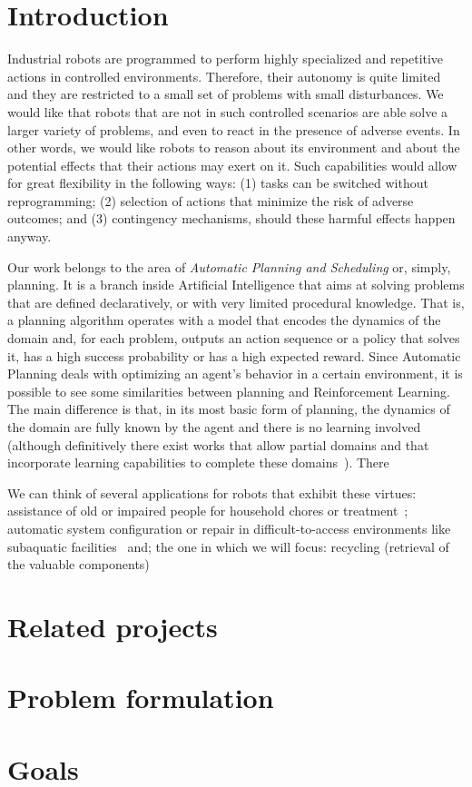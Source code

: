 \documentclass[../root.tex]{subfiles}
\begin{document}
\section{Introduction}

Industrial robots are programmed to perform highly specialized and
repetitive actions in controlled environments. Therefore, their
autonomy is quite limited and they are restricted to a small set
of problems with small disturbances. We would like that robots that are
not in such controlled scenarios are able solve a larger variety of
problems, and even to react in the presence
of adverse events.
In other words, we
would like robots to reason about its environment and about the
potential effects that their actions may exert on it.
Such capabilities would allow for great flexibility in the following
ways: (1) tasks can be switched without reprogramming; (2) selection
of actions that minimize the risk of adverse outcomes; and (3)
contingency mechanisms, should these harmful effects happen anyway.

Our work belongs to the area of \emph{Automatic Planning and Scheduling}
or, simply, planning. It is a branch inside Artificial
Intelligence that aims at solving problems that are defined
declaratively, or with very limited procedural knowledge. That is, a
planning algorithm
operates with a model that encodes the dynamics of the domain and, for
each problem, outputs
an action sequence
or a policy that solves it, has a high success probability or has a high
expected reward. Since Automatic Planning deals with optimizing an agent's
behavior in a certain environment, it is possible to see some
similarities between planning and Reinforcement Learning. The main difference
is that, in its most basic form of planning, the dynamics of the domain are fully
known by the agent and there is no learning involved (although definitively there
exist works that allow partial domains and that incorporate learning
capabilities to complete these domains~\cite{martinez2017relational, martinez2015vmin}).
There

We can think of several applications for robots that exhibit these
virtues: assistance of old or impaired people for household chores
or treatment~\cite{canal2018behavior,andriella2018deciding}; automatic system
configuration or repair in difficult-to-access environments like
subaquatic facilities~\cite{palomeras2016toward,ong2010planning} and; the one
in which we will focus: recycling (retrieval of the valuable components)

\section{Related projects}

\section{Problem formulation}

\section{Goals}

\end{document}
